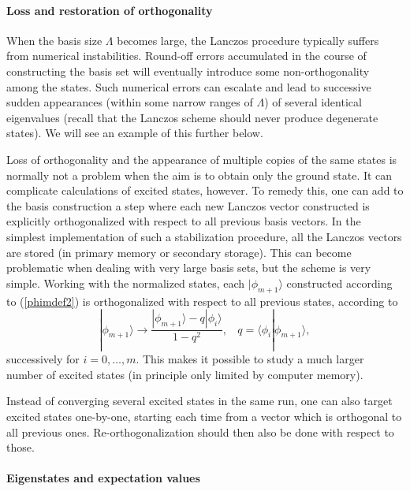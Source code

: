 \documentclass[draft,numberedheadings]{aipproc}
\begin{document}
\paragraph{Loss and restoration of orthogonality}

When the basis size $\Lambda$ becomes large, the Lanczos procedure typically suffers from numerical instabilities. Round-off errors accumulated in the 
course of constructing the basis set will eventually introduce some non-orthogonality among the states. Such numerical errors can escalate and lead to 
successive sudden appearances (within some narrow ranges of $\Lambda$) of several identical eigenvalues (recall that the Lanczos scheme should never 
produce degenerate states). We will see an example of this further below.

Loss of orthogonality and the appearance of multiple copies of the same states is normally not a problem when the aim is to obtain only the ground state. 
It can complicate calculations of excited states, however. To remedy this, one can add to the basis construction a step where each new 
Lanczos vector constructed is explicitly orthogonalized with respect to all previous basis vectors. In the simplest implementation of such a stabilization procedure,
all the Lanczos vectors are stored (in primary memory or secondary storage). This can become problematic when dealing with very large basis sets, but the scheme 
is very simple. Working with the normalized states, each $|\phi_{m+1}\rangle$ constructed according to (\ref{phimdef2}) is orthogonalized with respect to 
all previous states, according to
\begin{equation}
|\phi_{m+1}\rangle \to \frac{|\phi_{m+1}\rangle-q|\phi_i\rangle}{1-q^2},~~~~q=\langle\phi_i|\phi_{m+1}\rangle,
\label{lancreort}
\end{equation}
successively for $i=0,\ldots,m$. This makes it possible to study a much larger number of excited states (in principle only limited by computer memory). 

Instead of converging several excited states in the same run, one can also target excited states one-by-one, starting each time from a vector which 
is orthogonal to all previous ones. Re-orthogonalization should then also be done with respect to those. 

\paragraph{Eigenstates and expectation values}
\end{document}
